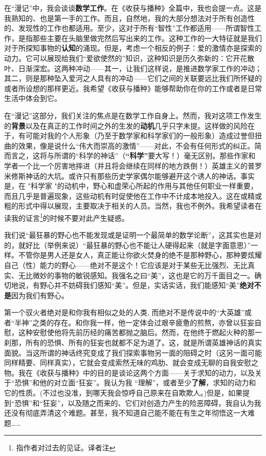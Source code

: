 \documentclass[UTF8, b5paper]{book}
\begin{document}
在“漫记”中，我会谈谈\textbf{数学工作}。在《收获与播种》全篇中，我也会提一点。这是我熟知的、也是第一手的工作。而且，自然地，我的大部分想法对于所有创造性的、发现性的工作也都适用。至少，这对于所有“智性”工作都适用——所谓智性工作，是指那些主要在头脑里做完然后写出来的工作。这种工作的一大特征就是我们对于所探知事物的\textbf{认知}的涌现。但是，考虑一个相反的例子：爱的激情亦是探索的动力。它可以展现给我们“爱欲使然的”知识，这种知识是历久弥新的：它开花散叶、日渐深宏。这两种冲动——其一，让我们这样说，是推进数学家工作的冲动；其二，则是那种坠入爱河之人具有的冲动——它们之间的关联要远比我们所怀疑的或者所设想的那样更近。我希望《收获与播种》能够帮助你在你的工作或者是日常生活中体会到它。\par
在“漫记”这部分，我们关注的焦点是在数学工作自身上。然而，我对这项工作发生的\textbf{背景}以及在真正的工作时间之外的生发的\textbf{动机}几乎只字未提。这样做的风险在于，有可能对我的个人形象（乃至于数学家和科学家们的一般形象）造成过誉但扭曲的效果，像是说什么“伟大而崇高的激情”——对此，不会有任何形式的纠正。简而言之，这将与所谓的“科学的神话”（\textbf{“科学”}要大写！）毫无区别。那些作家和学者一个比一个厉害地摔进（并且将会继续在同样的地方跌倒！）英雄主义的普罗米修斯神话的大坑。或许只有那些历史学家偶尔能够避开这个诱人的神话。事实是，在 "科学家 "的动机中，野心和虚荣心所起的作用与其他任何职业一样重要，而且几乎是普遍现象，这些动机有时促使他在工作中不计成本地投入。这在或精或粗的形式中得以展现，主要取决于相关的人员。当然，我也不例外。我希望读者在读我的证言\footnote{指作者对过去的见证。译者注}的时候不要对此产生疑惑。\par
我们说“最狂暴的野心也不能发现或是证明一个最简单的数学论断”，这其实也是对的，就好比（举例来说）“最狂暴的野心也不能让人硬得起来（就是字面意思）”一样。不管你是男人还是女人，真正能让你欲火焚身的绝不是那种野心，那种要炫耀自己（性）能力的野心——绝对不是这个！它应该是对于某些无比强烈、无比真实、无比微妙的事物的敏锐感知。我强名之曰“美”，这也是它的万千面目之一。确切地说，有野心并不妨碍我们感知“美”。但是，实话实话，我们能感知“美”\textbf{绝对不是}因为我们有野心。\par 
第一个驭火者绝对是和你我有相似之处的人类, 而绝对不是传说中的“大英雄”或者“半神”之类的存在。和你我一样，他一定体会过艰辛疲惫的煎熬，亦曾以狂妄自慰，这种安慰使他将先前历经的痛苦都抛之脑后。然而，在他终于燃起火种的那一刹那，所有的恐惧、所有的狂妄也就都不足为道了。这，就是所谓英雄神话的真实面貌。当这所谓的神话终究变成了我们探索事物另一面的阻碍之时（这另一面可能同样精要、同样真实），它就会变成索然无味的鸡肋、就会变成无聊的自我安慰之物。我在《收获与播种》中的目的是谈论这两个方面——关于求知的动力，以及关于“恐惧”和他的对立面“狂妄”。我认为我 “理解”，或者至少\textbf{了解}，求知的动力和它的性质。(不过也没准，到哪天我会惊呼自己原来在自欺欺人。)但是，如果提到“恐惧”和“狂妄”，以及随之而来的、它们对创造力产生的险恶障碍，我自认为我还没有彻底弄清这个难题。甚至，我不知道自己能不能在有生之年彻悟这一大难题……\par
\end{document}
